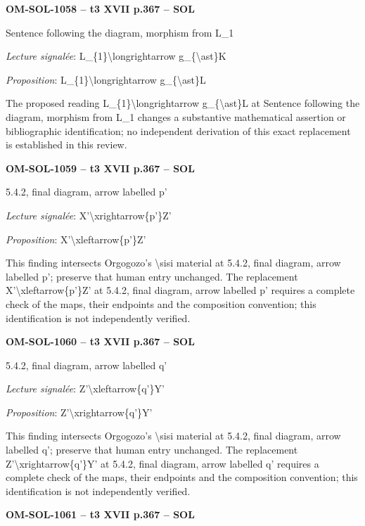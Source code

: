 \par\noindent\textbf{OM-SOL-1058 -- t3 XVII p.367 -- SOL}\par
Sentence following the diagram, morphism from L\_1\par
\emph{Lecture signalée}: L\_\{1\}\textbackslash{}longrightarrow g\_\{\textbackslash{}ast\}K\par
\emph{Proposition}: L\_\{1\}\textbackslash{}longrightarrow g\_\{\textbackslash{}ast\}L\par
The proposed reading L\_\{1\}\textbackslash{}longrightarrow g\_\{\textbackslash{}ast\}L at Sentence following the diagram, morphism from L\_1 changes a substantive mathematical assertion or bibliographic identification; no independent derivation of this exact replacement is established in this review.\par
\par\noindent\textbf{OM-SOL-1059 -- t3 XVII p.367 -- SOL}\par
5.4.2, final diagram, arrow labelled p'\par
\emph{Lecture signalée}: X'\textbackslash{}xrightarrow\{p'\}Z'\par
\emph{Proposition}: X'\textbackslash{}xleftarrow\{p'\}Z'\par
This finding intersects Orgogozo's \textbackslash{}sisi material at 5.4.2, final diagram, arrow labelled p'; preserve that human entry unchanged. The replacement X'\textbackslash{}xleftarrow\{p'\}Z' at 5.4.2, final diagram, arrow labelled p' requires a complete check of the maps, their endpoints and the composition convention; this identification is not independently verified.\par
\par\noindent\textbf{OM-SOL-1060 -- t3 XVII p.367 -- SOL}\par
5.4.2, final diagram, arrow labelled q'\par
\emph{Lecture signalée}: Z'\textbackslash{}xleftarrow\{q'\}Y'\par
\emph{Proposition}: Z'\textbackslash{}xrightarrow\{q'\}Y'\par
This finding intersects Orgogozo's \textbackslash{}sisi material at 5.4.2, final diagram, arrow labelled q'; preserve that human entry unchanged. The replacement Z'\textbackslash{}xrightarrow\{q'\}Y' at 5.4.2, final diagram, arrow labelled q' requires a complete check of the maps, their endpoints and the composition convention; this identification is not independently verified.\par
\par\noindent\textbf{OM-SOL-1061 -- t3 XVII p.367 -- SOL}\par
